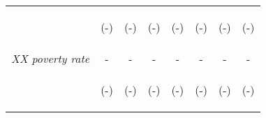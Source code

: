 \begin{tabular}{lccccccc}
\vspace{4pt} & \begin{footnotesize}(-)\end{footnotesize} &  \begin{footnotesize}(-)\end{footnotesize}  &  \begin{footnotesize}(-)\end{footnotesize}    &   \begin{footnotesize}(-)\end{footnotesize}   &   \begin{footnotesize}(-)\end{footnotesize}  &  \begin{footnotesize}(-)\end{footnotesize} &  \begin{footnotesize}(-)\end{footnotesize} \\
 


\textit{XX poverty rate}          		  &  -    &    -   &     -  &  -  &     -  & -   &  -    \\

\vspace{4pt} & \begin{footnotesize}(-)\end{footnotesize} &  \begin{footnotesize}(-)\end{footnotesize}  &  \begin{footnotesize}(-)\end{footnotesize}    &   \begin{footnotesize}(-)\end{footnotesize}   &   \begin{footnotesize}(-)\end{footnotesize}  &  \begin{footnotesize}(-)\end{footnotesize} &  \begin{footnotesize}(-)\end{footnotesize} \\




\end{tabular}
